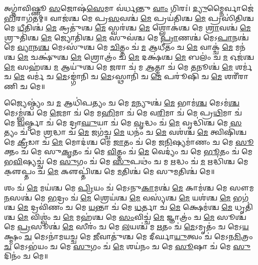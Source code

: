 𑌅𑌗𑍍𑌨𑌾॑𑌵𑌿𑌷𑍍𑌣𑍂 \ul{𑌸}𑌜𑍋𑌷॑\ul{𑌸𑍇}𑌮𑌾 𑌵॑𑌰𑍍𑌧𑌨𑍍𑌤𑍁 \ul{𑌵𑌾𑌂} 𑌗𑌿𑌰𑌃॑। \ul{𑌦𑍍𑌯𑍁}𑌮𑍍𑌨𑍈𑌰𑍍𑌵𑌾𑌜𑍇॑\ul{𑌭𑌿}𑌰𑌾\-𑌗॑𑌤𑌮𑍍॥ 
𑌵𑌾𑌜॑𑌶𑍍𑌚 𑌮𑍇 𑌪𑍍𑌰\ul{𑌸}𑌵𑌶𑍍𑌚॑ \ul{𑌮𑍇} 𑌪𑍍𑌰𑌯॑𑌤𑌿𑌶𑍍𑌚 \ul{𑌮𑍇} 𑌪𑍍𑌰𑌸𑌿॑𑌤𑌿𑌶𑍍𑌚 𑌮𑍇 \ul{𑌧𑍀}𑌤𑌿𑌶𑍍𑌚॑ \ul{𑌮𑍇} 𑌕𑍍𑌰𑌤𑍁॑𑌶𑍍𑌚 \ul{𑌮𑍇} 𑌸𑍍𑌵𑌰॑𑌶𑍍𑌚 \ul{𑌮𑍇} 𑌶𑍍𑌲𑍋𑌕॑𑌶𑍍𑌚 𑌮𑍇 \ul{𑌶𑍍𑌰𑌾}𑌵𑌶𑍍𑌚॑ \ul{𑌮𑍇} 𑌶𑍍𑌰𑍁𑌤𑌿॑𑌶𑍍𑌚 \ul{𑌮𑍇} 𑌜𑍍𑌯𑍋𑌤𑌿॑𑌶𑍍𑌚 \ul{𑌮𑍇} 𑌸𑍁𑌵॑𑌶𑍍𑌚 𑌮𑍇 \ul{𑌪𑍍𑌰𑌾}𑌣𑌶𑍍𑌚॑ 𑌮𑍇𑌽\ul{𑌪𑌾}𑌨𑌶𑍍𑌚॑ 𑌮𑍇 \ul{𑌵𑍍𑌯𑌾}𑌨\ul{𑌶𑍍𑌚} 𑌮𑍇𑌽𑌸𑍁॑𑌶𑍍𑌚 𑌮𑍇 \ul{𑌚𑌿}𑌤𑍍𑌤𑌂 𑌚॑ \ul{𑌮} 𑌆𑌧𑍀॑𑌤𑌂 𑌚 \ul{𑌮𑍇} 𑌵𑌾𑌕𑍍𑌚॑ \ul{𑌮𑍇} 𑌮𑌨॑𑌶𑍍𑌚 \ul{𑌮𑍇} 𑌚𑌕𑍍𑌷𑍁॑𑌶𑍍𑌚 \ul{𑌮𑍇} 𑌶𑍍𑌰𑍋𑌤𑍍𑌰𑌂॑ 𑌚 \ul{𑌮𑍇} 𑌦𑌕𑍍𑌷॑𑌶𑍍𑌚 \ul{𑌮𑍇} 𑌬𑌲𑌂॑ 𑌚 \ul{𑌮} 𑌓𑌜॑𑌶𑍍𑌚 \ul{𑌮𑍇} 𑌸𑌹॑𑌶𑍍𑌚 \ul{𑌮} 𑌆𑌯𑍁॑𑌶𑍍𑌚 𑌮𑍇 \ul{𑌜}𑌰𑌾 𑌚॑ 𑌮 \ul{𑌆}𑌤𑍍𑌮𑌾 𑌚॑ 𑌮𑍇 \ul{𑌤}𑌨𑍂𑌶𑍍𑌚॑ \ul{𑌮𑍇} 𑌶𑌰𑍍𑌮॑ 𑌚 \ul{𑌮𑍇} 𑌵𑌰𑍍𑌮॑ 𑌚 \ul{𑌮𑍇}𑌽𑌙𑍍𑌗𑌾॑𑌨𑌿 𑌚 \ul{𑌮𑍇}𑌽𑌸𑍍𑌥𑌾𑌨𑌿॑ 𑌚 \ul{𑌮𑍇} 𑌪𑌰𑍂॑𑌷𑌿 𑌚 \ul{𑌮𑍇} 𑌶𑌰𑍀॑𑌰𑌾𑌣𑌿 𑌚 𑌮𑍇॥


𑌜𑍍𑌯𑍈𑌷𑍍𑌠𑍍𑌯𑌂॑ 𑌚 \ul{𑌮} 𑌆𑌧𑌿॑𑌪𑌤𑍍𑌯𑌂 𑌚 𑌮𑍇 \ul{𑌮}𑌨𑍍𑌯𑍁𑌶𑍍𑌚॑ \ul{𑌮𑍇} 𑌭𑌾𑌮॑\ul{𑌶𑍍𑌚} 𑌮𑍇𑌽𑌮॑\ul{𑌶𑍍𑌚} 𑌮𑍇𑌽𑌮𑍍𑌭॑𑌶𑍍𑌚 𑌮𑍇 \ul{𑌜𑍇}𑌮𑌾 𑌚॑ 𑌮𑍇 𑌮\ul{𑌹𑌿}𑌮𑌾 𑌚॑ 𑌮𑍇 𑌵\ul{𑌰𑌿}𑌮𑌾 𑌚॑ 𑌮𑍇 𑌪𑍍𑌰\ul{𑌥𑌿}𑌮𑌾 𑌚॑ 𑌮𑍇 \ul{𑌵}𑌰𑍍𑌷𑍍𑌮𑌾 𑌚॑ 𑌮𑍇 𑌦𑍍𑌰𑌾\ul{𑌘𑍁}𑌯𑌾 𑌚॑ 𑌮𑍇 \ul{𑌵𑍃}𑌦𑍍𑌧𑌂 𑌚॑ \ul{𑌮𑍇} 𑌵𑍃𑌦𑍍𑌧𑌿॑𑌶𑍍𑌚 𑌮𑍇 \ul{𑌸}𑌤𑍍𑌯𑌂 𑌚॑ 𑌮𑍇 \ul{𑌶𑍍𑌰}𑌦𑍍𑌧𑌾 𑌚॑ \ul{𑌮𑍇} 𑌜𑌗॑𑌚𑍍𑌚 \ul{𑌮𑍇} 𑌧𑌨𑌂॑ 𑌚 \ul{𑌮𑍇} 𑌵𑌶॑𑌶𑍍𑌚 \ul{𑌮𑍇} 𑌤𑍍𑌵𑌿𑌷𑌿॑𑌶𑍍𑌚 𑌮𑍇 \ul{𑌕𑍍𑌰𑍀}𑌡𑌾 𑌚॑ \ul{𑌮𑍇} 𑌮𑍋𑌦॑𑌶𑍍𑌚 𑌮𑍇 \ul{𑌜𑌾}𑌤𑌂 𑌚॑ 𑌮𑍇 𑌜\ul{𑌨𑌿}𑌷𑍍𑌯𑌮𑌾॑𑌣𑌂 𑌚 𑌮𑍇 \ul{𑌸𑍂}𑌕𑍍𑌤𑌂 𑌚॑ 𑌮𑍇 𑌸𑍁\ul{𑌕𑍃}𑌤𑌂 𑌚॑ 𑌮𑍇 \ul{𑌵𑌿}𑌤𑍍𑌤𑌂 𑌚॑ \ul{𑌮𑍇} 𑌵𑍇𑌦𑍍𑌯𑌂॑ 𑌚 𑌮𑍇 \ul{𑌭𑍂}𑌤𑌂 𑌚॑ 𑌮𑍇 𑌭\ul{𑌵𑌿}𑌷𑍍𑌯𑌚𑍍𑌚॑ 𑌮𑍇 \ul{𑌸𑍁}𑌗𑌂 𑌚॑ 𑌮𑍇 \ul{𑌸𑍁}𑌪𑌥𑌂॑ 𑌚 𑌮 \ul{𑌋}𑌦𑍍𑌧𑌂 𑌚॑ \ul{𑌮} 𑌋𑌦𑍍𑌧𑌿॑𑌶𑍍𑌚 𑌮𑍇 𑌕𑍢॒𑌪𑍍𑌤𑌂 𑌚॑ \ul{𑌮𑍇} 𑌕𑍢𑌪𑍍𑌤𑌿॑𑌶𑍍𑌚 𑌮𑍇 \ul{𑌮}𑌤𑌿𑌶𑍍𑌚॑ 𑌮𑍇 𑌸𑍁\ul{𑌮}𑌤𑌿𑌶𑍍𑌚॑ 𑌮𑍇॥


𑌶𑌂 𑌚॑ \ul{𑌮𑍇} 𑌮𑌯॑𑌶𑍍𑌚 𑌮𑍇 \ul{𑌪𑍍𑌰𑌿}𑌯𑌂 𑌚॑ 𑌮𑍇𑌽𑌨𑍁\ul{𑌕𑌾}𑌮𑌶𑍍𑌚॑ \ul{𑌮𑍇} 𑌕𑌾𑌮॑𑌶𑍍𑌚 𑌮𑍇 𑌸𑍗𑌮\ul{𑌨}𑌸𑌶𑍍𑌚॑ 𑌮𑍇 \ul{𑌭}𑌦𑍍𑌰𑌂 𑌚॑ \ul{𑌮𑍇} 𑌶𑍍𑌰𑍇𑌯॑𑌶𑍍𑌚 \ul{𑌮𑍇} 𑌵𑌸𑍍𑌯॑𑌶𑍍𑌚 \ul{𑌮𑍇} 𑌯𑌶॑𑌶𑍍𑌚 \ul{𑌮𑍇} 𑌭𑌗॑𑌶𑍍𑌚 \ul{𑌮𑍇} 𑌦𑍍𑌰𑌵𑌿॑𑌣𑌂 𑌚 𑌮𑍇 \ul{𑌯}𑌨𑍍𑌤𑌾 𑌚॑ 𑌮𑍇 \ul{𑌧}𑌰𑍍𑌤𑌾 𑌚॑ \ul{𑌮𑍇} 𑌕𑍍𑌷𑍇𑌮॑𑌶𑍍𑌚 \ul{𑌮𑍇} 𑌧𑍃𑌤𑌿॑𑌶𑍍𑌚 \ul{𑌮𑍇} 𑌵𑌿𑌶𑍍𑌵𑌂॑ 𑌚 \ul{𑌮𑍇} 𑌮𑌹॑𑌶𑍍𑌚 𑌮𑍇 \ul{𑌸𑌂}𑌵𑌿𑌚𑍍𑌚॑ \ul{𑌮𑍇} 𑌜𑍍𑌞𑌾𑌤𑍍𑌰𑌂॑ 𑌚 \ul{𑌮𑍇} 𑌸𑍂𑌶𑍍𑌚॑ 𑌮𑍇 \ul{𑌪𑍍𑌰}𑌸𑍂𑌶𑍍𑌚॑ \ul{𑌮𑍇} 𑌸𑍀𑌰𑌂॑ 𑌚 𑌮𑍇 \ul{𑌲}𑌯𑌶𑍍𑌚॑ 𑌮 \ul{𑌋}𑌤𑌂 𑌚॑ \ul{𑌮𑍇}𑌽𑌮𑍃𑌤𑌂॑ 𑌚 𑌮𑍇𑌽\ul{𑌯}𑌕𑍍𑌷𑍍𑌮𑌂 \ul{𑌚} 𑌮𑍇𑌽𑌨𑌾॑𑌮𑌯𑌚𑍍𑌚 𑌮𑍇 \ul{𑌜𑍀}𑌵𑌾𑌤𑍁॑𑌶𑍍𑌚 𑌮𑍇 𑌦𑍀𑌰𑍍𑌘𑌾\ul{𑌯𑍁}𑌤𑍍𑌵𑌂 𑌚॑ 𑌮𑍇𑌽𑌨\ul{𑌮𑌿}𑌤𑍍𑌰𑌂 \ul{𑌚} 𑌮𑍇𑌽𑌭॑𑌯𑌂 𑌚 𑌮𑍇 \ul{𑌸𑍁}𑌗𑌂 𑌚॑ \ul{𑌮𑍇} 𑌶𑌯॑𑌨𑌂 𑌚 𑌮𑍇 \ul{𑌸𑍂}𑌷𑌾 𑌚॑ 𑌮𑍇 \ul{𑌸𑍁}𑌦𑌿𑌨𑌂॑ 𑌚 𑌮𑍇॥


